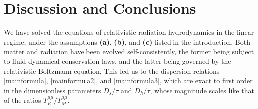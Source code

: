 \documentclass[a4paper, amsfonts, amssymb, amsmath, reprint, showkeys, nofootinbib, twoside,notitlepage,onecolumn]{revtex4-2}
\theoremstyle{definition}
\theoremstyle{theorem}
\theoremstyle{corollary}
\begin{document}







\section{Discussion and Conclusions}
\vspace{-0.2cm}

We have solved the equations of relativistic radiation hydrodynamics in the linear regime,
under the assumptions \textbf{(a)}, \textbf{(b)}, and \textbf{(c)} listed in the introduction. Both matter and radiation have been evolved self-consistently, the former being subject to fluid-dynamical conservation laws, and the latter being governed by the relativistic Boltzmann equation. This led us to the dispersion relations \eqref{mainformula}, \eqref{mainformula2}, and \eqref{mainformula3}, which are exact to first order in the dimensionless parameters $D_s/\tau$ and $D_h/\tau$, whose magnitude scales like that of the ratios $T^{\mu \mu}_R/T^{\mu \mu}_M$.
\end{document}
